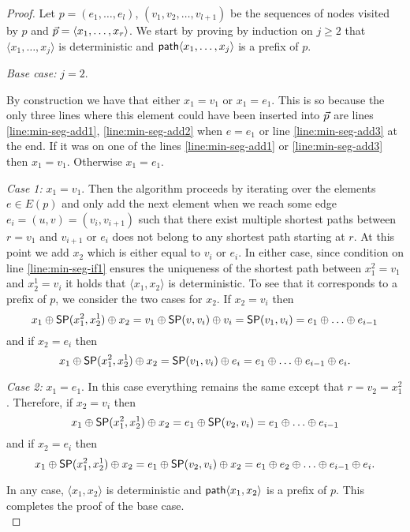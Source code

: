\begin{proof}
Let $p = (e_1, \ldots, e_l)$, $(v_1, v_2, \ldots, v_{l + 1})$ be the sequences of nodes visited by $p$ and
$\sr{p} = \langle x_1, \ldots, x_r \rangle$. We start by proving by induction on $j \geq 2$ that $\langle x_1, \ldots, x_j \rangle$ is
deterministic and $\seq \langle x_1, \ldots, x_j \rangle$ is a prefix of $p$.

\emph{Base case:} $j = 2$.

By construction we have that either $x_1 = v_1$ or $x_1 = e_1$. This is so because the only three lines where this element 
could have been inserted into $\sr{p}$ are lines \ref{line:min-seg-add1}, \ref{line:min-seg-add2} when $e = e_1$ or line \ref{line:min-seg-add3} at the end.
If it was on one of the lines \ref{line:min-seg-add1} or \ref{line:min-seg-add3} then $x_1 = v_1$. Otherwise $x_1 = e_1$.

\emph{Case 1:} $x_1 = v_1$. Then the algorithm proceeds by iterating over the elements $e \in E(p)$ and only add the next element when we reach some edge $e_i = (u, v) = (v_i, v_{i + 1})$ 
such that there exist multiple shortest paths between $r = v_1$ and $v_{i + 1}$ or $e_i$ does not belong to any shortest path starting at $r$.
At this point we add $x_2$ which is either
equal to $v_i$ or $e_i$. In either case, since condition on line \ref{line:min-seg-if1} ensures the uniqueness of the shortest path between
$x^2_1 = v_1$ and $x^1_2 = v_i$ it holds that $\langle x_1, x_2 \rangle$ is deterministic. To see that it corresponds to a prefix of $p$, we consider the two cases for $x_2$.
If $x_2 = v_i$ then
$$
x_1 \oplus \sp(x^2_1, x^1_2) \oplus x_2 = v_1 \oplus \sp(v, v_i) \oplus v_i = \sp(v_1, v_i) = e_1 \oplus \ldots \oplus e_{i - 1}
$$ 
and if $x_2 = e_i$ then
$$
x_1 \oplus \sp(x^2_1, x^1_2) \oplus x_2 = \sp(v_1, v_i) \oplus e_i = e_1 \oplus \ldots \oplus e_{i - 1} \oplus e_i.
$$

\emph{Case 2:} $x_1 = e_1$. In this case everything remains the same except that $r = v_2 = x^2_1$. Therefore, if $x_2 = v_i$ then
$$
x_1 \oplus \sp(x^2_1, x^1_2) \oplus x_2 = e_1 \oplus \sp(v_2, v_i) = e_1 \oplus \ldots \oplus e_{i - 1}
$$ 
and if $x_2 = e_i$ then
$$
x_1 \oplus \sp(x^2_1, x^1_2) \oplus x_2 = e_1 \oplus \sp(v_2, v_i) \oplus x_2 = e_1 \oplus e_2 \oplus \ldots \oplus e_{i - 1} \oplus e_i.
$$

In any case, $\langle x_1, x_2 \rangle$ is deterministic and $\seq \langle x_1, x_2 \rangle$ is a prefix of $p$.  
This completes the proof of the base case. \\


\end{proof}
